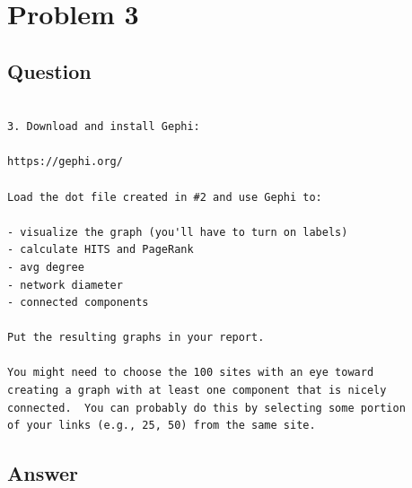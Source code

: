 \section{Problem 3}
\label{part3}
\subsection*{Question}
\begingroup
\begin{verbatim}

3. Download and install Gephi:

https://gephi.org/

Load the dot file created in #2 and use Gephi to:

- visualize the graph (you'll have to turn on labels)
- calculate HITS and PageRank
- avg degree
- network diameter
- connected components

Put the resulting graphs in your report.

You might need to choose the 100 sites with an eye toward
creating a graph with at least one component that is nicely
connected.  You can probably do this by selecting some portion
of your links (e.g., 25, 50) from the same site.  

\end{verbatim}
\subsection{Answer}

